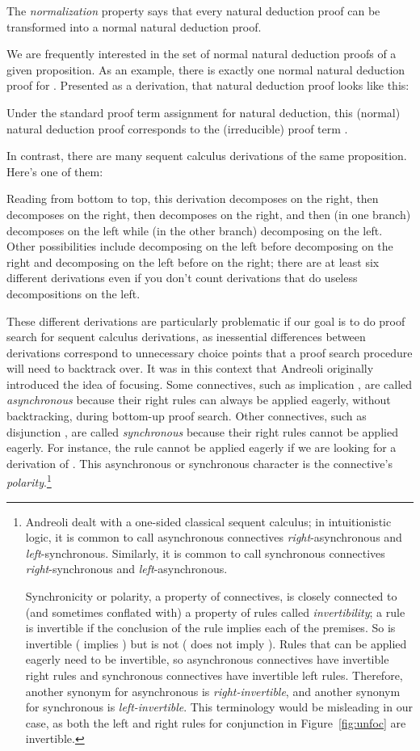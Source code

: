 \documentclass[acmtocl]{robtrans}\pdfoutput=1
\begin{document}
The {\it normalization} property says that every 
natural deduction proof can be transformed
into a normal natural deduction proof. 

We are frequently interested in the set of normal natural deduction
proofs of a given proposition.  As an example, there is exactly one
normal natural deduction proof for . Presented as a derivation, that natural
deduction proof looks like this:

Under the standard proof term assignment for natural deduction,
this (normal) natural deduction proof corresponds to the (irreducible) 
proof term .
 
In contrast, there are many sequent calculus derivations of the same
proposition.  Here's one of them:

Reading from bottom to top, this derivation decomposes 
 on the right, then
decomposes  on the right, then decomposes
 on the right, and then (in one branch) decomposes 
on the left while (in the other branch) decomposing  on the left.
Other possibilities include decomposing  on the left 
before decomposing  on the right
and decomposing  on the left before  on the right;
there are at least six 
different derivations even if you don't count derivations
that do useless decompositions on the left. 

These different derivations are particularly problematic if our goal
is to do proof search for sequent calculus derivations, as inessential
differences between derivations correspond to unnecessary choice
points that a proof search procedure will need to backtrack over.  It
was in this context that Andreoli originally introduced the idea of
focusing. Some connectives, such as implication , are
called {\it asynchronous} because their right rules can always be
applied eagerly, without backtracking, during bottom-up proof
search. Other connectives, such as disjunction , are called
{\it synchronous} because their right rules cannot be applied
eagerly. For instance, the  rule cannot be applied eagerly
if we are looking for a derivation of . 
This 
asynchronous or synchronous character is the connective's {\it
  polarity}.\footnote{Andreoli dealt with a one-sided classical sequent
  calculus; in intuitionistic logic, it is common to call asynchronous
  connectives {\it right}-asynchronous and {\it
    left}-synchronous. Similarly, it is common to call synchronous
  connectives {\it right}-synchronous and {\it left}-asynchronous.

  Synchronicity or polarity, a property of connectives, is closely
  connected to (and sometimes conflated with) a property of rules
  called {\it invertibility}; a rule is invertible if the conclusion
  of the rule implies each of the premises. So  is
  invertible ( implies ) but  is not ( does not imply ).
  Rules that can be applied eagerly need to be invertible, so
  asynchronous connectives have invertible right rules and synchronous
  connectives have invertible left rules. Therefore, another synonym
  for asynchronous is {\it right-invertible}, and another synonym for
  synchronous is {\it left-invertible}. This terminology would be
  misleading in our case, as both the left and right rules for
  conjunction in Figure~\ref{fig:unfoc} are invertible.}
\end{document}
